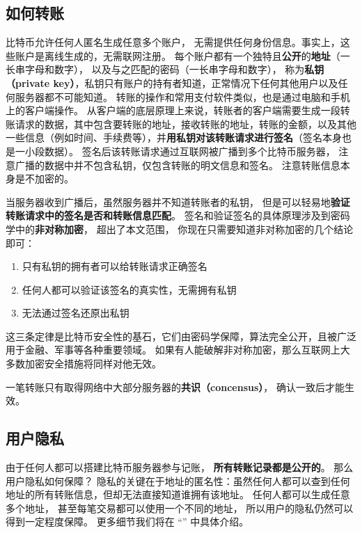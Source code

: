 \subsection{如何转账}
比特币允许任何人匿名生成任意多个账户， 无需提供任何身份信息。事实上，这些账户是离线生成的，无需联网注册。 每个账户都有一个独特且\textbf{公开}的\textbf{地址}（一长串字母和数字）， 以及与之匹配的密码（一长串字母和数字）， 称为\textbf{私钥（private key）}，私钥只有账户的持有者知道，正常情况下任何其他用户以及任何服务器都不可能知道。 转账的操作和常用支付软件类似，也是通过电脑和手机上的客户端操作。 从客户端的底层原理上来说，转账者的客户端需要生成一段转账请求的数据，其中包含要转账的地址，接收转账的地址，转账的金额，以及其他一些信息（例如时间、手续费等），并\textbf{用私钥对该转账请求进行签名}（签名本身也是一小段数据）。 签名后该转账请求通过互联网被广播到多个比特币服务器， 注意广播的数据中并不包含私钥，仅包含转账的明文信息和签名。 注意转账信息本身是不加密的。

当服务器收到广播后，虽然服务器并不知道转账者的私钥， 但是可以轻易地\textbf{验证转账请求中的签名是否和转账信息匹配}。 签名和验证签名的具体原理涉及到密码学中的\textbf{非对称加密}， 超出了本文范围， 你现在只需要知道非对称加密的几个结论即可：
\begin{enumerate}
\item 只有私钥的拥有者可以给转账请求正确签名
\item 任何人都可以验证该签名的真实性，无需拥有私钥
\item 无法通过签名还原出私钥
\end{enumerate}
这三条定律是比特币安全性的基石，它们由密码学保障，算法完全公开，且被广泛用于金融、军事等各种重要领域。 如果有人能破解非对称加密，那么互联网上大多数加密安全措施将同样对他无效。

一笔转账只有取得网络中大部分服务器的\textbf{共识（concensus）}， 确认一致后才能生效。


\subsection{用户隐私}
由于任何人都可以搭建比特币服务器参与记账， \textbf{所有转账记录都是公开的}。 那么用户隐私如何保障？ 隐私的关键在于地址的匿名性：虽然任何人都可以查到任何地址的所有转账信息，但却无法直接知道谁拥有该地址。 任何人都可以生成任意多个地址， 甚至每笔交易都可以使用一个不同的地址， 所以用户的隐私仍然可以得到一定程度保障。 更多细节我们将在 “” 中具体介绍。

